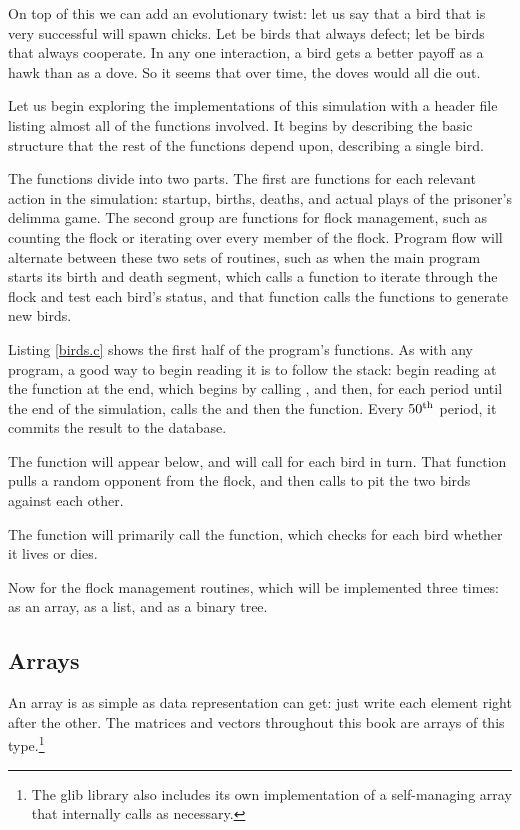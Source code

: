 On top of this we can add an evolutionary twist: let us say that a bird
that is very successful will spawn chicks. Let  be birds
that always defect; let  be birds that always cooperate. In
any one interaction, a bird gets a  better payoff as a hawk than as a dove.
So it seems that over time, the doves would all die out. 

Let us begin exploring the implementations of this simulation with a
header file listing almost all of the functions involved. It begins by
describing the basic structure that the rest of the functions depend
upon, describing a single bird.

The functions divide into two parts. The first are functions for
each relevant action in the simulation: startup, births, deaths, and
actual plays of the prisoner's delimma game. The second group are
functions for flock management, such as counting the flock or iterating
over every member of the flock. Program flow will alternate between
these two sets of routines, such as when the main program starts its
birth and death segment, which calls a function to iterate through the
flock and test each bird's status, and that function calls the functions
to generate new birds.


Listing \ref{birds.c} shows the first half of the program's functions.
As with any program, a good way to begin reading
it is to follow the stack: begin reading at the  function at the
end, which begins by calling , and then, for each period until
the end of the simulation, calls the  and then the
 function. Every $50^{\rm th}$ period, it commits the result
to the database.

The  function will appear below, and will call
 for each bird in turn. That function pulls a random
opponent from the flock, and then calls  to pit the
two birds against each other.

The  function will primarily call the 
function, which checks for each bird whether it lives or dies.


Now for the flock management routines, which will be implemented three
times: as an array, as a list, and as a binary tree.

\subsection{Arrays} An array is as simple as data representation can
get: just write each element right after the other. The matrices
and vectors throughout this book are arrays of this type.\footnote{The glib
library also includes its own implementation of a self-managing array
that internally calls  as necessary.}

